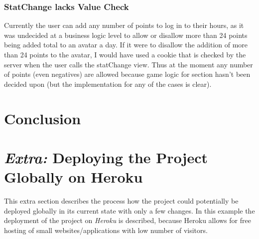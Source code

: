 \documentclass[11pt,a4paper]{article}
\begin{document}
\subsubsection{StatChange lacks Value Check}
Currently the user can add any number of points to log in to their hours, as it was undecided at a business logic level to allow or disallow more than 24 points being added total to an avatar a day. If it were to disallow the addition of more than 24 points to the avatar, I would have used a cookie that is checked by the server when the user calls the statChange view. Thus at the moment any number of points (even negatives) are allowed because game logic for section hasn't been decided upon (but the implementation for any of the cases is clear).

\section{Conclusion}

\section{\textit{Extra:} Deploying the Project Globally on Heroku}
This extra section describes the process how the project could potentially be deployed globally in its current state with only a few changes. In this example the deployment of the project on \textit{Heroku} is described, because Heroku allows for free hosting of small websites/applications with low number of visitors.
\end{document}
